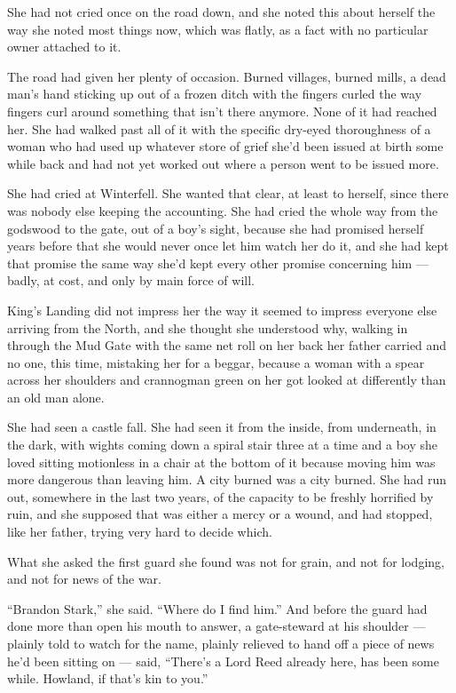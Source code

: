 She had not cried once on the road down, and she noted this about herself the way she noted most things now, which was flatly, as a fact with no particular owner attached to it.

The road had given her plenty of occasion. Burned villages, burned mills, a dead man’s hand sticking up out of a frozen ditch with the fingers curled the way fingers curl around something that isn’t there anymore. None of it had reached her. She had walked past all of it with the specific dry-eyed thoroughness of a woman who had used up whatever store of grief she’d been issued at birth some while back and had not yet worked out where a person went to be issued more.

She had cried at Winterfell. She wanted that clear, at least to herself, since there was nobody else keeping the accounting. She had cried the whole way from the godswood to the gate, out of a boy’s sight, because she had promised herself years before that she would never once let him watch her do it, and she had kept that promise the same way she’d kept every other promise concerning him — badly, at cost, and only by main force of will.

\sceneBreak

King’s Landing did not impress her the way it seemed to impress everyone else arriving from the North, and she thought she understood why, walking in through the Mud Gate with the same net roll on her back her father carried and no one, this time, mistaking her for a beggar, because a woman with a spear across her shoulders and crannogman green on her got looked at differently than an old man alone.

She had seen a castle fall. She had seen it from the inside, from underneath, in the dark, with wights coming down a spiral stair three at a time and a boy she loved sitting motionless in a chair at the bottom of it because moving him was more dangerous than leaving him. A city burned was a city burned. She had run out, somewhere in the last two years, of the capacity to be freshly horrified by ruin, and she supposed that was either a mercy or a wound, and had stopped, like her father, trying very hard to decide which.

What she asked the first guard she found was not for grain, and not for lodging, and not for news of the war.

“Brandon Stark,” she said. “Where do I find him.” And before the guard had done more than open his mouth to answer, a gate-steward at his shoulder — plainly told to watch for the name, plainly relieved to hand off a piece of news he’d been sitting on — said, “There’s a Lord Reed already here, has been some while. Howland, if that’s kin to you.”

